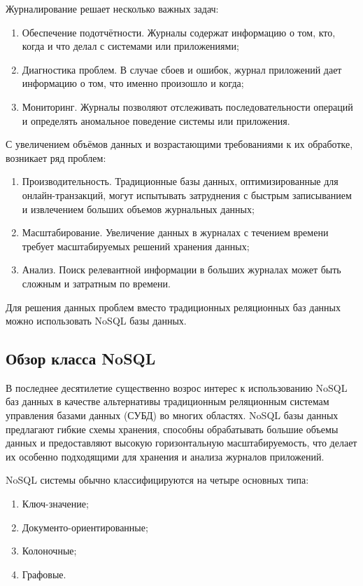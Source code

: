 \documentclass[14pt, russian]{scrartcl}
\begin{document}
Журналирование решает несколько важных задач:

\begin{enumerate}
	\item Обеспечение подотчётности. Журналы содержат информацию о том, кто, когда и что делал с системами или приложениями;
	\item Диагностика проблем. В случае сбоев и ошибок, журнал приложений дает информацию о том, что именно произошло и когда;
	\item Мониторинг. Журналы позволяют отслеживать последовательности операций и определять аномальное поведение системы или приложения.
\end{enumerate}

С увеличением объёмов данных и возрастающими требованиями к их обработке, возникает ряд проблем:

\begin{enumerate}
	\item Производительность. Традиционные базы данных, оптимизированные для онлайн-транзакций, могут испытывать затруднения с быстрым записыванием и извлечением больших объемов журнальных данных;
	\item Масштабирование. Увеличение данных в журналах с течением времени требует масштабируемых решений хранения данных;
	\item Анализ. Поиск релевантной информации в больших журналах может быть сложным и затратным по времени.
\end{enumerate}

Для решения данных проблем вместо традиционных реляционных баз данных можно использовать NoSQL базы данных.

\subsection{Обзор класса NoSQL}

В последнее десятилетие существенно возрос интерес к использованию NoSQL баз данных в качестве альтернативы традиционным реляционным системам управления базами данных (СУБД) во многих областях. NoSQL базы данных предлагают гибкие схемы хранения, способны обрабатывать большие объемы данных и предоставляют высокую горизонтальную масштабируемость, что делает их особенно подходящими для хранения и анализа журналов приложений.

NoSQL системы обычно классифицируются на четыре основных типа:

\begin{enumerate}
	\item Ключ-значение;
	\item Документо-ориентированные;
	\item Колоночные;
	\item Графовые.
\end{enumerate}
\end{document}
